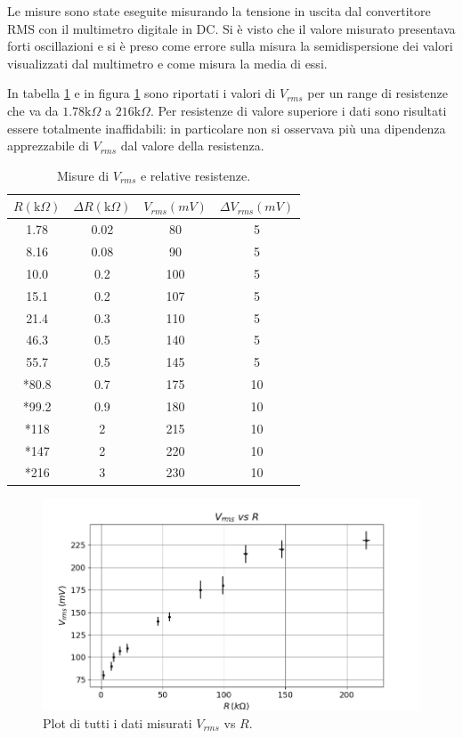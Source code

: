 \documentclass[10pt,a4paper]{article}
\begin{document}
Le misure sono state eseguite misurando la tensione in uscita dal convertitore RMS con il multimetro digitale in DC. Si è visto che il valore misurato presentava forti oscillazioni e si è preso come errore sulla misura la semidispersione dei valori visualizzati dal multimetro e come misura la media di essi.

In tabella \ref{bodeEstesi} e in figura \ref{boltzmannEsteso} sono riportati i valori di $V_{rms}$ per un range di resistenze che va da $1.78\mbox{k}\Omega$ a $216\mbox{k}\Omega$. Per resistenze di valore superiore i dati sono risultati essere totalmente inaffidabili: in particolare non si osservava più una dipendenza apprezzabile di $V_{rms}$ dal valore della resistenza.


\begin{table}[!htb]\centering
\begin{tabular}{|c|c|c|c|}
\hline
$R (\mbox{k}\Omega)$ & $\Delta R (\mbox{k}\Omega)$ & $V_{rms} (mV)$ & $\Delta V_{rms} (mV)$\\
\hline
1.78 & 0.02 & 80 & 5\\
8.16 & 0.08 & 90 & 5\\
10.0 & 0.2 & 100 & 5\\
15.1 & 0.2 & 107 & 5\\
21.4 & 0.3 & 110 & 5\\
46.3 & 0.5 & 140 & 5\\
55.7 & 0.5 & 145 & 5\\
*80.8 & 0.7 & 175 & 10\\
*99.2 & 0.9 & 180 & 10\\
*118 & 2 & 215 & 10\\
*147 & 2 & 220 & 10\\
*216 & 3 & 230 & 10\\
\hline
\end{tabular}
\caption{Misure di $V_{rms}$ e relative resistenze.}
\label{bodeEstesi}
\end{table}

\begin{figure}[!htb]
\centering
\includegraphics[scale=0.8]{boltzmannEsteso.png}
\caption{Plot di tutti i dati misurati $V_{rms}$ vs $R$.\label{boltzmannEsteso}}
\end{figure}
\end{document}
